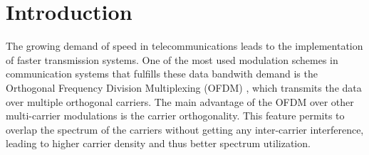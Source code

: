\documentclass[conference]{IEEEtran}
\begin{document}





%
\IEEEpeerreviewmaketitle

\section{Introduction}

The growing demand of speed in telecommunications leads to the implementation of faster transmission systems.
One of the most used modulation schemes in communication systems that fulfills these data bandwith demand is the  
Orthogonal Frequency Division Multiplexing (OFDM) \cite{Prasad2_1}, which transmits the data  over multiple orthogonal carriers.
The main advantage of the OFDM over other multi-carrier modulations is the carrier orthogonality. This feature permits to overlap 
the spectrum of the carriers without getting any inter-carrier interference, leading to higher carrier density and thus better spectrum
utilization.

\end{document}
